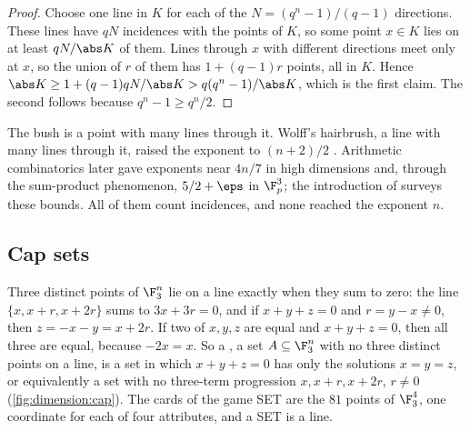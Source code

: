 \begin{refsection}

\begin{proof}
Choose one line in $K$ for each of the $N=(q^n-1)/(q-1)$ directions. These lines have $qN$ incidences with the points of $K$, so some point $x\in K$ lies on at least $qN/\abs K$ of them. Lines through $x$ with different directions meet only at $x$, so the union of $r$ of them has $1+(q-1)r$ points, all in $K$. Hence $\abs K\ge1+(q-1)qN/\abs K>q(q^n-1)/\abs K$, which is the first claim. The second follows because $q^n-1\ge q^n/2$.
\end{proof}

The bush is a point with many lines through it. Wolff's hairbrush, a line with many lines through it, raised the exponent to $(n+2)/2$ \parencite{Wolff1999}. Arithmetic combinatorics later gave exponents near $4n/7$ in high dimensions and, through the sum-product phenomenon, $5/2+\eps$ in $\F_p^3$; the introduction of \textcite{Dvir2009} surveys these bounds. All of them count incidences, and none reached the exponent $n$.

\subsection{Cap sets}\label{sec:dimension:capset-before}

Three distinct points of $\F_3^n$ lie on a line exactly when they sum to zero: the line $\{x,x+r,x+2r\}$ sums to $3x+3r=0$, and if $x+y+z=0$ and $r=y-x\ne0$, then $z=-x-y=x+2r$. If two of $x,y,z$ are equal and $x+y+z=0$, then all three are equal, because $-2x=x$. So a , a set $A\subseteq\F_3^n$ with no three distinct points on a line, is a set in which $x+y+z=0$ has only the solutions $x=y=z$, or equivalently a set with no three-term progression $x,x+r,x+2r$, $r\ne0$ (\cref{fig:dimension:cap}). The cards of the game SET are the $81$ points of $\F_3^4$, one coordinate for each of four attributes, and a SET is a line.


\end{refsection}
